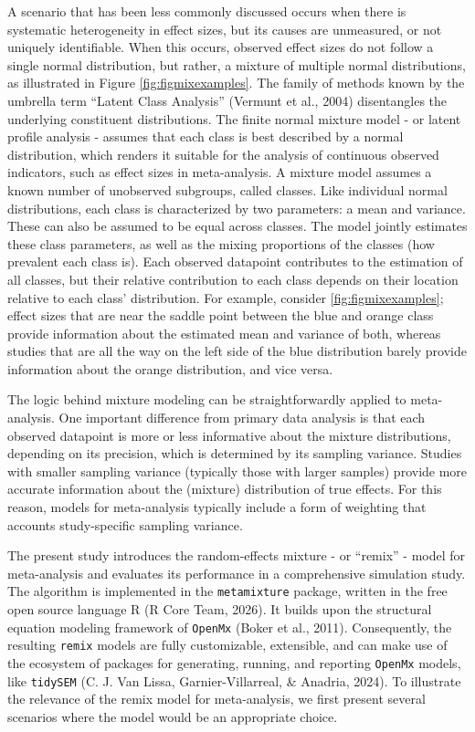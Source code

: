 \documentclass[
  english,
  man, noextraspace,floatsintext]{apa6}
\begin{document}
A scenario that has been less commonly discussed occurs when there is systematic heterogeneity in effect sizes,
but its causes are unmeasured, or not uniquely identifiable.
When this occurs, observed effect sizes do not follow a single normal distribution,
but rather, a mixture of multiple normal distributions, as illustrated in Figure \ref{fig:figmixexamples}.
The family of methods known by the umbrella term ``Latent Class Analysis'' (Vermunt et al., 2004) disentangles the underlying constituent distributions.
The finite normal mixture model - or latent profile analysis - assumes that each class is best described by a normal distribution, which renders it suitable for the analysis of continuous observed indicators, such as effect sizes in meta-analysis.
A mixture model assumes a known number of unobserved subgroups, called classes.
Like individual normal distributions, each class is characterized by two parameters: a mean and variance.
These can also be assumed to be equal across classes.
The model jointly estimates these class parameters, as well as the mixing proportions of the classes (how prevalent each class is).
Each observed datapoint contributes to the estimation of all classes,
but their relative contribution to each class depends on their location relative to each class' distribution.
For example, consider \ref{fig:figmixexamples}; effect sizes that are near the saddle point between the blue and orange class provide information about the estimated mean and variance of both, whereas studies that are all the way on the left side of the blue distribution barely provide information about the orange distribution, and vice versa.

The logic behind mixture modeling can be straightforwardly applied to meta-analysis.
One important difference from primary data analysis is that each observed datapoint is more or less informative about the mixture distributions, depending on its precision,
which is determined by its sampling variance.
Studies with smaller sampling variance (typically those with larger samples) provide more accurate information about the (mixture) distribution of true effects.
For this reason, models for meta-analysis typically include a form of weighting that accounts study-specific sampling variance.

The present study introduces the random-effects mixture - or ``remix'' - model for meta-analysis and evaluates its performance in a comprehensive simulation study.
The algorithm is implemented in the \texttt{metamixture} package, written in the free open source language R (R Core Team, 2026).
It builds upon the structural equation modeling framework of \texttt{OpenMx} (Boker et al., 2011).
Consequently, the resulting \texttt{remix} models are fully customizable, extensible, and can make use of the ecosystem of packages for generating, running, and reporting \texttt{OpenMx} models, like \texttt{tidySEM} (C. J. Van Lissa, Garnier-Villarreal, \& Anadria, 2024).
To illustrate the relevance of the remix model for meta-analysis, we first present several scenarios where the model would be an appropriate choice.
\end{document}
